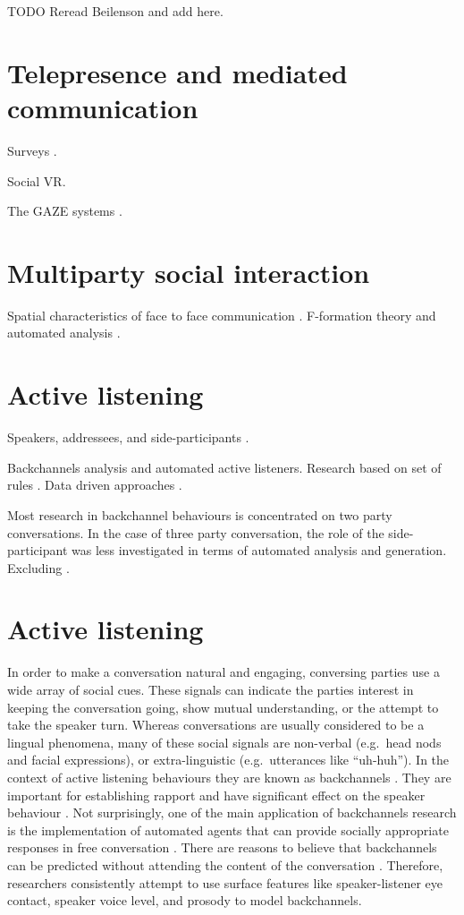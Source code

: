 \documentclass[]{simple-thesis}
\begin{document}
TODO Reread Beilenson and add here.

\section{Telepresence and mediated communication}

Surveys \citep{Isaacs1994, Erickson2000}.

Social VR.

The GAZE systems \citep{Vertegaal1999, Vertegaal2003}.

\section{Multiparty social interaction}

Spatial characteristics of face to face communication \citep{Schegloff1998}.
F-formation theory \citep{Kendon1990} and automated analysis \citep{Setti2015}.

\section{Active listening}

Speakers, addressees, and side-participants \citep{Clark1982}.

Backchannels analysis and automated active listeners.
Research based on set of rules \citep{Ward2000, Nishimura2007, Gratch2007}.
Data driven approaches \citep{Morency2008, Huang2011, Kok2012}.

Most research in backchannel behaviours is concentrated on two party conversations.
In the case of three party conversation, the role of the side-participant was less investigated in terms of automated analysis and generation.
Excluding \citep{Matsusaka2003, Fujie2009}.
\section{Active listening}

In order to make a conversation natural and engaging, conversing parties use a wide array of social cues.
These signals can indicate the parties interest in keeping the conversation going, show mutual understanding, or the attempt to take the speaker turn.
Whereas conversations are usually considered to be a lingual phenomena, many of these social signals are non-verbal (e.g.\ head nods and facial expressions), or extra-linguistic (e.g.\ utterances like ``uh-huh'').
In the context of active listening behaviours they are known as backchannels \citep{Yngve1970}.
They are important for establishing rapport \citep{Gratch2007} and have significant effect on the speaker behaviour \citep{Bavelas2000}.
Not surprisingly, one of the main application of backchannels research is the implementation of automated agents that can provide socially appropriate responses in free conversation \citep{Morency2008, Bevacqua2008}.
There are reasons to believe that backchannels can be predicted without attending the content of the conversation \citep{Yngve1970}.
Therefore, researchers consistently attempt to use surface features like speaker-listener eye contact, speaker voice level, and prosody to model backchannels.
\end{document}
